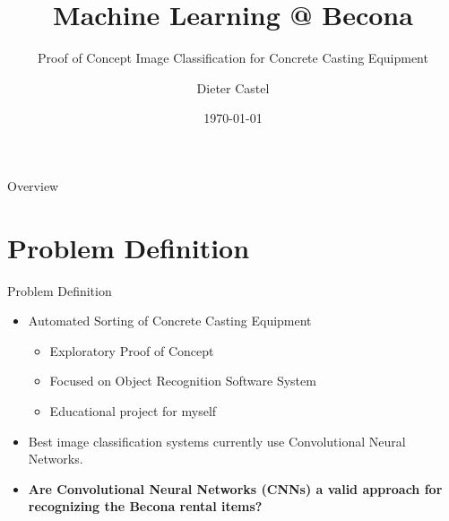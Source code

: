 \documentclass{beamer}
\title{Machine Learning @ Becona}
\subtitle{Proof of Concept Image Classification for Concrete Casting Equipment}
\author{Dieter Castel}
\date{\today}
\begin{document}
\begin{frame}
  \titlepage
\end{frame}

\begin{frame}{Overview}
\tableofcontents
\end{frame}

\section{Problem Definition}
\begin{frame}{Problem Definition}
  \begin{itemize}
	    \item Automated Sorting of Concrete Casting Equipment 
	    \begin{itemize}
	      \item Exploratory Proof of Concept 
	      \item Focused on Object Recognition Software System
	      \item Educational project for myself 
	    \end{itemize}
	    \item Best image classification systems currently use Convolutional Neural Networks.
	    \item \textbf{Are Convolutional Neural Networks (CNNs) a valid approach for recognizing the Becona rental items?}
  \end{itemize}
\end{frame}
\end{document}
